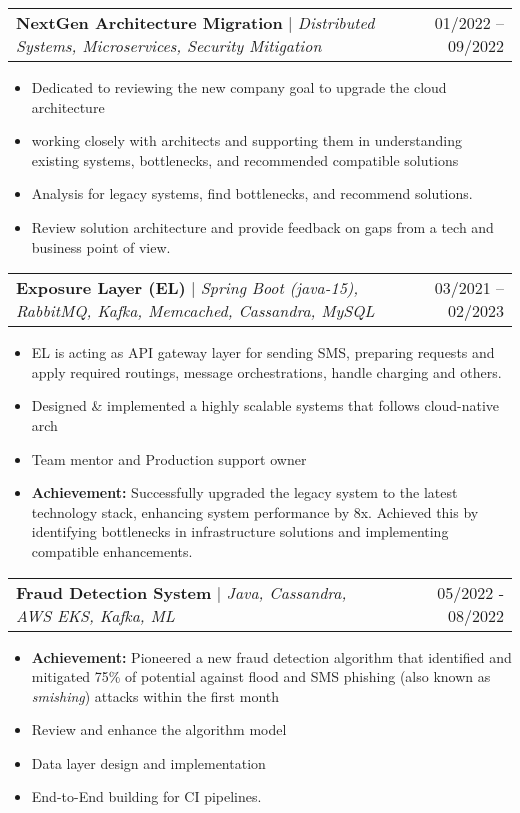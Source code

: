 \documentclass[letterpaper,11pt]{article}
\makeatletter
\newcommand{\resumeItem}[1]{
  \item\small{
    {#1 \vspace{-2pt}}
  }
}
\newcommand{\resumeProjectHeading}[2]{
    \item
    \begin{tabular*}{0.97\textwidth}{l@{\extracolsep{\fill}}r}
      \small#1 & #2 \\
    \end{tabular*}\vspace{-7pt}
}
\newcommand{\resumeItemListStart}{\begin{itemize}}
\newcommand{\resumeItemListEnd}{\end{itemize}\vspace{-5pt}}
\makeatother
\begin{document}
   		 \vspace{2mm}


        \resumeProjectHeading
        {\textbf{NextGen Architecture Migration} $|$ \footnotesize\emph{Distributed Systems, Microservices, Security Mitigation}}
        {01/2022 -- 09/2022}
        \resumeItemListStart
            \resumeItem{Dedicated to reviewing the new company goal to upgrade the cloud architecture}
            \resumeItem{working closely with architects and supporting them in understanding existing systems, bottlenecks, and recommended compatible solutions}
            \resumeItem{Analysis for legacy systems, find bottlenecks, and recommend solutions.}
            \resumeItem{Review solution architecture and provide feedback on gaps from a tech and business point of view. }
          \resumeItemListEnd
		
		\vspace{2mm}		
		
        \resumeProjectHeading
        {\textbf{Exposure Layer (EL)} $|$ \footnotesize\emph{Spring Boot (java-15), RabbitMQ, Kafka, Memcached, Cassandra, MySQL}}
        {03/2021 -- 02/2023}
        \resumeItemListStart
            \resumeItem{EL is acting as API gateway layer for sending SMS, preparing requests and apply required routings, message orchestrations, handle charging and others.}
            \resumeItem{Designed \& implemented a highly scalable systems that follows cloud-native arch}
            \resumeItem{Team mentor and Production support owner}
            \resumeItem{\textbf{Achievement:} Successfully upgraded the legacy system to the latest technology stack, enhancing system performance by 8x. Achieved this by identifying bottlenecks in infrastructure solutions and implementing compatible enhancements. }
          \resumeItemListEnd
          
          
       \vspace{2mm}
       
       
      \resumeProjectHeading
        {\textbf{Fraud Detection System} $|$ \footnotesize\emph{Java, Cassandra, AWS EKS, Kafka, ML}}{05/2022 - 08/2022}
        \resumeItemListStart
            \resumeItem{\textbf{Achievement:} Pioneered a new fraud detection algorithm that identified and mitigated 75\% of potential against flood and SMS phishing (also known as \textit{smishing}) attacks within the first month}
            \resumeItem{Review and enhance the algorithm model}
            \resumeItem{Data layer design and implementation}
            \resumeItem{End-to-End building for CI pipelines.}
        \resumeItemListEnd
\end{document}
